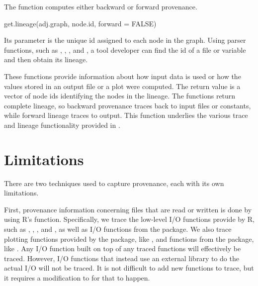 The  function computes either backward or forward provenance. %
\begin{example}
get.lineage(adj.graph, node.id, forward = FALSE)
\end{example}
Its  parameter is the unique id assigned to each node in the graph. Using parser functions, such as , , , and , a tool developer can find the id of a file or variable and then obtain its lineage.

%

These functions provide information about how input data is used or how the values stored in an output file or a plot were computed.  The return value is a vector of node ids identifying the nodes in the lineage.  The functions return complete lineage, so backward provenance traces back to input files or constants, while forward lineage traces to output.
This function underlies the various trace and lineage functionality provided in .



\section{Limitations}
There are two techniques used to capture provenance, each with its own limitations.  

First, provenance information concerning files that are read or written is done by using R's  function.  Specifically, we trace the low-level I/O functions provide by R, such as , , , and , as well as I/O functions from the  package.  We also trace plotting functions provided by the  package, like , and functions from the  package, like .  Any I/O function built on top of any traced functions will effectively be traced.  However, I/O functions that instead use an external library to do the actual I/O will not be traced.  It is not difficult to add new functions to trace, but it requires a modification to  for that to happen.

